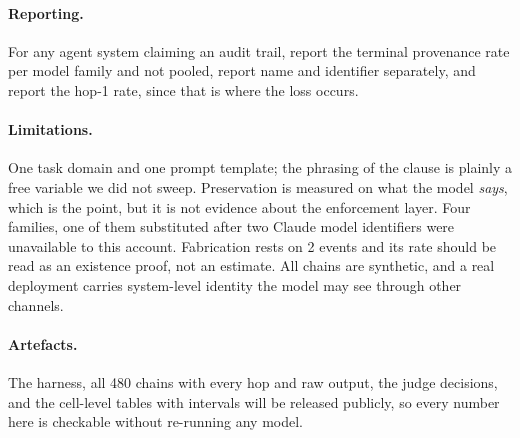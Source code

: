 \documentclass{article}
\begin{document}
\paragraph{Reporting.} For any agent system claiming an audit trail, report the terminal
provenance rate per model family and not pooled, report name and identifier separately, and report
the hop-1 rate, since that is where the loss occurs.

\paragraph{Limitations.} One task domain and one prompt template; the phrasing of the clause is
plainly a free variable we did not sweep. Preservation is measured on what the model \emph{says},
which is the point, but it is not evidence about the enforcement layer. Four families, one of them
substituted after two Claude model identifiers were unavailable to this account. Fabrication rests
on 2 events and its rate should be read as an existence proof, not an estimate. All chains are
synthetic, and a real deployment carries system-level identity the model may see through other
channels.

\paragraph{Artefacts.} The harness, all 480 chains with every hop and raw output, the judge
decisions, and the cell-level tables with intervals will be released publicly, so every number
here is checkable without re-running any model.
\end{document}

